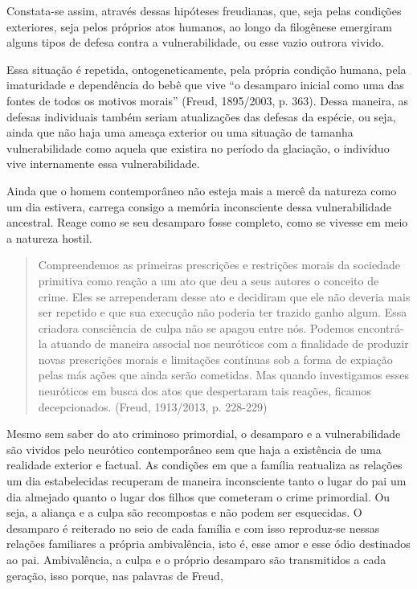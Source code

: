 Constata-se assim, através dessas hipóteses freudianas, que, seja pelas
condições exteriores, seja pelos próprios atos humanos, ao longo da
filogênese emergiram alguns tipos de defesa contra a vulnerabilidade, ou
esse vazio outrora vivido.

Essa situação é repetida, ontogeneticamente, pela própria condição
humana, pela imaturidade e dependência do bebê que vive ``o desamparo
inicial como uma das fontes de todos os motivos morais'' (Freud,
1895/2003, p. 363). Dessa maneira, as defesas individuais também seriam
atualizações das defesas da espécie, ou seja, ainda que não haja uma
ameaça exterior ou uma situação de tamanha vulnerabilidade como aquela
que existira no período da glaciação, o indivíduo vive internamente essa
vulnerabilidade.

Ainda que o homem contemporâneo não esteja mais a mercê da natureza como
um dia estivera, carrega consigo a memória inconsciente dessa
vulnerabilidade ancestral. Reage como se seu desamparo fosse completo,
como se vivesse em meio a natureza hostil.

\begin{quote}
Compreendemos as primeiras prescrições e restrições morais da sociedade
primitiva como reação a um ato que deu a seus autores o conceito de
crime. Eles se arrependeram desse ato e decidiram que ele não deveria
mais ser repetido e que sua execução não poderia ter trazido ganho
algum. Essa criadora consciência de culpa não se apagou entre nós.
Podemos encontrá-la atuando de maneira associal nos neuróticos com a
finalidade de produzir novas prescrições morais e limitações contínuas
sob a forma de expiação pelas más ações que ainda serão cometidas. Mas
quando investigamos esses neuróticos em busca dos atos que despertaram
tais reações, ficamos decepcionados. (Freud, 1913/2013, p. 228-229)
\end{quote}

Mesmo sem saber do ato criminoso primordial, o desamparo e a
vulnerabilidade são vividos pelo neurótico contemporâneo sem que haja a
existência de uma realidade exterior e factual. As condições em que a
família reatualiza as relações um dia estabelecidas recuperam de maneira
inconsciente tanto o lugar do pai um dia almejado quanto o lugar dos
filhos que cometeram o crime primordial. Ou seja, a aliança e a culpa
são recompostas e não podem ser esquecidas. O desamparo é reiterado no
seio de cada família e com isso reproduz-se nessas relações familiares a
própria ambivalência, isto é, esse amor e esse ódio destinados ao pai.
Ambivalência, a culpa e o próprio desamparo são transmitidos a cada
geração, isso porque, nas palavras de Freud,

